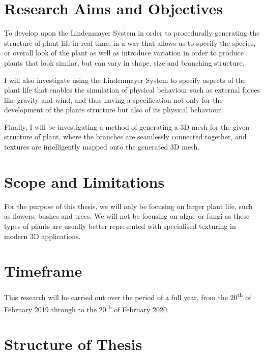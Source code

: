 \section{Research Aims and Objectives}

\begin{flushleft}

To develop upon the Lindenmayer System in order to procedurally generating the structure of plant life in real time, in a way that allows us to specify the species, or overall look of the plant as well as introduce variation in order to produce plants that look similar, but can vary in shape, size and branching structure. \\

\vspace{5mm}

I will also investigate using the Lindenmayer System to specify aspects of the plant life that enables the simulation of physical behaviour such as external forces like gravity and wind, and thus having a specification not only for the development of the plants structure but also of its physical behaviour. \\

\vspace{5mm}

Finally, I will be investigating a method of generating a 3D mesh for the given structure of plant, where the branches are seamlessly connected together, and textures are intelligently mapped onto the generated 3D mesh.\\ 

\end{flushleft} 


\section{Scope and Limitations}

\begin{flushleft}

For the purpose of this thesis, we will only be focusing on larger plant life, such as flowers, bushes and trees. We will not be focusing on algae or fungi as these types of plants are usually better represented with specialised texturing in modern 3D applications.\\

\vspace{5mm}



\end{flushleft}

\section{Timeframe}

\begin{flushleft}

This research will be carried out over the period of a full year, from the 20\textsuperscript{th} of February 2019 through to the 20\textsuperscript{th} of February 2020. 

\end{flushleft}

\section{Structure of Thesis}




